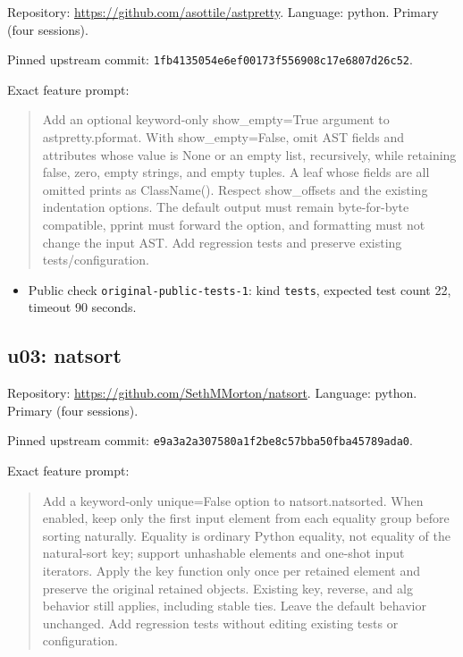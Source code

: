 \documentclass[manuscript,screen,nonacm]{acmart}
\providecommand{\tightlist}{\setlength{\itemsep}{0pt}\setlength{\parskip}{0pt}}
\begin{document}
Repository: \url{https://github.com/asottile/astpretty}. Language:
python. Primary (four sessions).

Pinned upstream commit:
\nolinkurl{1fb4135054e6ef00173f556908c17e6807d26c52}.

Exact feature prompt:

\begin{quote}
Add an optional keyword-only show\_empty=True argument to
astpretty.pformat. With show\_empty=False, omit AST fields and
attributes whose value is None or an empty list, recursively, while
retaining false, zero, empty strings, and empty tuples. A leaf whose
fields are all omitted prints as ClassName(). Respect show\_offsets and
the existing indentation options. The default output must remain
byte-for-byte compatible, pprint must forward the option, and formatting
must not change the input AST. Add regression tests and preserve
existing tests/configuration.
\end{quote}

\begin{itemize}
\tightlist
\item
  Public check \nolinkurl{original-public-tests-1}: kind \texttt{tests},
  expected test count 22, timeout 90 seconds.
\end{itemize}

\subsection{u03: natsort}\label{u03-natsort}

Repository: \url{https://github.com/SethMMorton/natsort}. Language:
python. Primary (four sessions).

Pinned upstream commit:
\nolinkurl{e9a3a2a307580a1f2be8c57bba50fba45789ada0}.

Exact feature prompt:

\begin{quote}
Add a keyword-only unique=False option to natsort.natsorted. When
enabled, keep only the first input element from each equality group
before sorting naturally. Equality is ordinary Python equality, not
equality of the natural-sort key; support unhashable elements and
one-shot input iterators. Apply the key function only once per retained
element and preserve the original retained objects. Existing key,
reverse, and alg behavior still applies, including stable ties. Leave
the default behavior unchanged. Add regression tests without editing
existing tests or configuration.
\end{quote}
\end{document}
